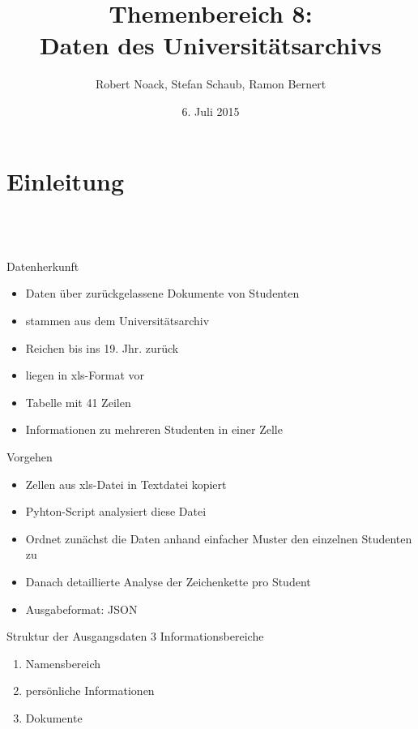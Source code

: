 \documentclass[12pt]{beamer}
\author{Robert Noack, Stefan Schaub, Ramon Bernert}
\title{\textbf{Themenbereich 8: \\Daten des Universitätsarchivs}}
\date{6. Juli 2015}
\begin{document}
\begin{large}
\section*{}
\begin{frame}
\titlepage
\end{frame}

\begin{frame}
\tableofcontents
\end{frame}

\section{Einleitung}
 \subsection*{~}
\begin{frame}{Datenherkunft}
 \begin{itemize}
  \item Daten über zurückgelassene Dokumente von Studenten
  \item stammen aus dem Universitätsarchiv
  \item Reichen bis ins 19. Jhr. zurück
  \item liegen in xls-Format vor
  \item Tabelle mit 41 Zeilen
  \item Informationen zu mehreren Studenten in einer Zelle
 \end{itemize}

\end{frame}


\begin{frame}{Vorgehen}
 \begin{itemize}
  \item Zellen aus xls-Datei in Textdatei kopiert
  \item Pyhton-Script analysiert diese Datei
  \item Ordnet zunächst die Daten anhand einfacher Muster den einzelnen Studenten zu
  \item Danach detaillierte Analyse der Zeichenkette pro Student
  \item Ausgabeformat: JSON
 \end{itemize}
\end{frame}


\begin{frame}{Struktur der Ausgangsdaten}
3 Informationsbereiche
 \begin{enumerate}
  \item Namensbereich
  \item persönliche Informationen
  \item Dokumente
 \end{enumerate}


\end{frame}
\end{large}
\end{document}
